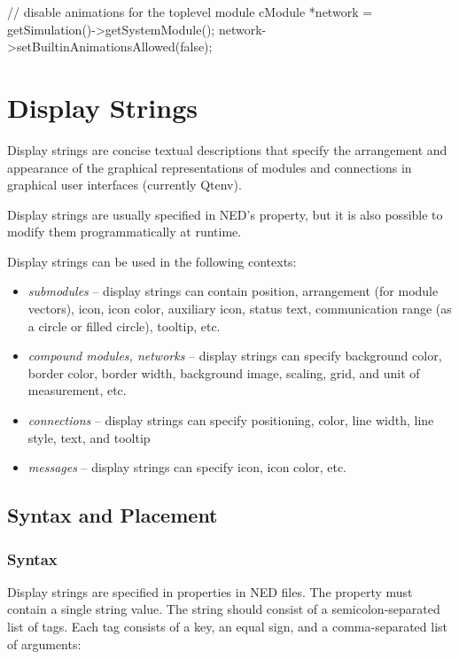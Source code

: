 \begin{cpp}
// disable animations for the toplevel module
cModule *network = getSimulation()->getSystemModule();
network->setBuiltinAnimationsAllowed(false);
\end{cpp}



\section{Display Strings}
\label{sec:graphics:display-strings}

Display strings are concise textual descriptions that
specify the arrangement and appearance of the graphical representations of
modules and connections in graphical user interfaces (currently Qtenv).

Display strings are usually specified in NED's  property, but it
is also possible to modify them programmatically at runtime.

Display strings can be used in the following contexts:
\begin{itemize}
  \item \textit{submodules} -- display strings can contain position, arrangement
    (for module vectors), icon, icon color, auxiliary icon, status text,
    communication range (as a circle or filled circle), tooltip, etc.
  \item \textit{compound modules, networks} -- display strings can specify
    background color, border color, border width, background image, scaling, grid,
    and unit of measurement, etc.
  \item \textit{connections} -- display strings can specify positioning, color,
    line width, line style, text, and tooltip
  \item \textit{messages} -- display strings can specify icon, icon color, etc.
\end{itemize}


\subsection{Syntax and Placement}
\label{sec:graphics:displaystring-syntax-and-placement}

\subsubsection{Syntax}
\label{sec:graphics:dispstr-syntax}

Display strings are specified in  properties in NED files. The
property must contain a single string value. The string should consist of a
semicolon-separated list of tags. Each tag consists of a key, an equal sign, and
a comma-separated list of arguments:

